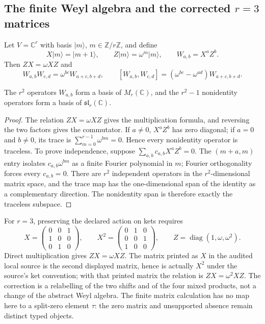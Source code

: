 \subsection{The finite Weyl algebra and the corrected $r=3$ matrices}

Let $V=\mathbb C^r$ with basis $|m\rangle$, $m\in\mathbb Z/r\mathbb Z$, and
define
\[
 X|m\rangle=|m+1\rangle,
 \qquad Z|m\rangle=\omega^m|m\rangle,
 \qquad W_{a,b}=X^aZ^b.
\]
Then $ZX=\omega XZ$ and
\[
 W_{a,b}W_{c,d}=\omega^{bc}W_{a+c,b+d},
 \qquad
 [W_{a,b},W_{c,d}]
   =(\omega^{bc}-\omega^{ad})W_{a+c,b+d}.
\]

\begin{theorem}
\label{thm:primitive-weyl-basis}
The $r^2$ operators $W_{a,b}$ form a basis of $M_r(\mathbb C)$, and the
$r^2-1$ nonidentity operators form a basis of $\mathfrak{sl}_r(\mathbb C)$.
\end{theorem}

\begin{proof}
The relation $ZX=\omega XZ$ gives the multiplication formula, and reversing
the two factors gives the commutator.  If $a\ne0$, $X^aZ^b$ has zero diagonal;
if $a=0$ and $b\ne0$, its trace is
$\sum_{m=0}^{r-1}\omega^{bm}=0$.  Hence every nonidentity operator is
traceless.  To prove independence, suppose
$\sum_{a,b}c_{a,b}X^aZ^b=0$.  The $(m+a,m)$ entry isolates
$c_{a,b}\omega^{bm}$ as a finite Fourier polynomial in $m$; Fourier
orthogonality forces every $c_{a,b}=0$.  There are $r^2$ independent
operators in the $r^2$-dimensional matrix space, and the trace map has the
one-dimensional span of the identity as a complementary direction.  The
nonidentity span is therefore exactly the traceless subspace.
\end{proof}

For $r=3$, preserving the declared action on kets requires
\[
 X=\begin{pmatrix}0&0&1\\1&0&0\\0&1&0\end{pmatrix},
 \qquad
 X^2=\begin{pmatrix}0&1&0\\0&0&1\\1&0&0\end{pmatrix},
 \qquad
 Z=\operatorname{diag}(1,\omega,\omega^2).
\]
Direct multiplication gives $ZX=\omega XZ$.  The matrix printed as $X$ in
the audited local source is the second displayed matrix, hence is actually
$X^2$ under the source's ket convention; with that printed matrix the relation
is $ZX=\omega^2XZ$.  The correction is a relabelling of the two shifts and of
the four mixed products, not a change of the abstract Weyl algebra.  The
finite matrix calculation has no map here to a split-zero element $\tau$:
the zero matrix and unsupported absence remain distinct typed objects.

